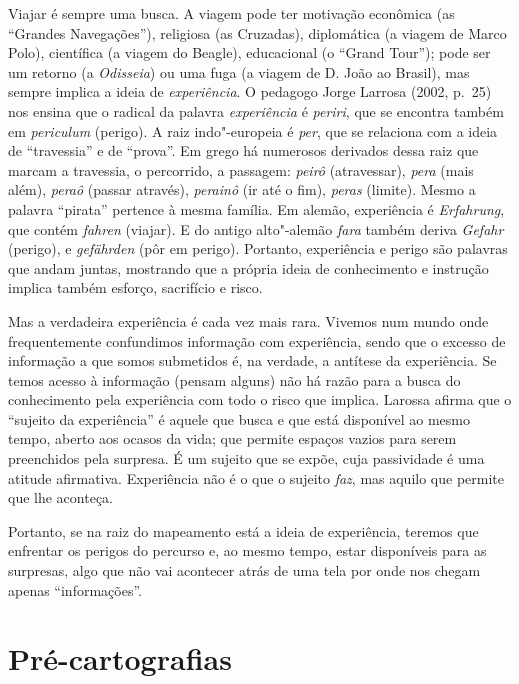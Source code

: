 Viajar é sempre uma busca. A viagem pode ter motivação econômica (as
``Grandes Navegações''), religiosa (as Cruzadas), diplomática (a viagem
de Marco Polo), científica (a viagem do Beagle), educacional (o ``Grand
Tour''); pode ser um retorno (a \emph{Odisseia}) ou uma fuga (a viagem de D.
João  ao Brasil), mas sempre implica a ideia de \emph{experiência}. O
pedagogo Jorge Larrosa (2002, p.~25) nos ensina que o radical da palavra
\emph{experiência} é \emph{periri}, que se encontra também em
\emph{periculum} (perigo). A raiz indo"-europeia é \emph{per}, que se
relaciona com a ideia de ``travessia'' e de ``prova''. Em grego há
numerosos derivados dessa raiz que marcam a travessia, o percorrido, a
passagem: \emph{peirô} (atravessar), \emph{pera} (mais além),
\emph{peraô} (passar através), \emph{perainô} (ir até o fim),
\emph{peras} (limite). Mesmo a palavra ``pirata'' pertence à mesma
família. Em alemão, experiência é \emph{Erfahrung}, que contém
\emph{fahren} (viajar). E do antigo alto"-alemão \emph{fara} também
deriva \emph{Gefahr} (perigo), e \emph{gefährden} (pôr em perigo).
Portanto, experiência e perigo são palavras que andam juntas, mostrando
que a própria ideia de conhecimento e instrução implica também
esforço, sacrifício e risco.

Mas a verdadeira experiência é cada vez mais rara. Vivemos num mundo
onde frequentemente confundimos informação com experiência, sendo que o
excesso de informação a que somos submetidos é, na verdade, a antítese
da experiência. Se temos acesso à informação (pensam alguns) não há razão para a busca do conhecimento pela experiência com todo o risco que implica. Larossa afirma que o ``sujeito da experiência'' é aquele
que busca e que está disponível ao mesmo tempo, aberto aos ocasos da
vida; que permite espaços vazios para serem preenchidos pela surpresa. É
um sujeito que se expõe, cuja passividade é uma atitude afirmativa.
Experiência não é o que o sujeito \emph{faz}, mas aquilo que permite que
lhe aconteça.

Portanto, se na raiz do mapeamento está a ideia de experiência, teremos
que enfrentar os perigos do percurso e, ao mesmo tempo, estar
disponíveis para as surpresas, algo que não vai acontecer atrás de uma
tela por onde nos chegam apenas ``informações''.

\chapter{Pré-cartografias}

